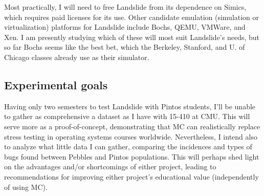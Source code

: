 Most practically, I will need to free Landslide from its dependence on Simics,
which requires paid licenses for its use. %
Other candidate emulation (simulation or virtualization) platforms for Landslide include Bochs, QEMU, VMWare, and Xen.
I am presently studying which of these will most suit Landslide's needs,
but so far Bochs seems like the best bet,
which the Berkeley, Stanford, and U. of Chicago classes already use as their simulator.

\subsection{Experimental goals}

Having only two semesters to test Landslide with Pintos students,
I'll be unable to gather as comprehensive a dataset as I have with 15-410 at CMU.
This will serve more as a proof-of-concept, demonstrating that MC can realistically replace stress testing in operating systems courses worldwide.
Nevertheless, I intend also to analyze what little data I can gather, comparing the incidences and types of bugs found between Pebbles and Pintos populations.
This will perhaps shed light on the advantages and/or shortcomings of either project,
leading to recommendations for improving either project's educational value (independently of using MC).

